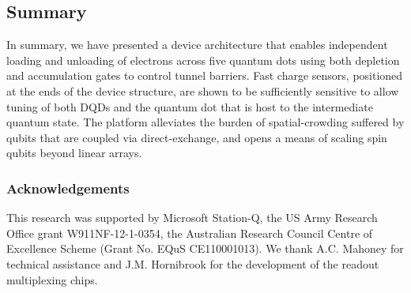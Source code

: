 \subsection{Summary}
In summary, we have presented a device architecture that enables independent loading and unloading of electrons across five quantum dots using both depletion and accumulation gates to control tunnel barriers. Fast charge sensors, positioned at the ends of the device structure, are shown to be sufficiently sensitive to allow tuning of both DQDs and the quantum dot that is host to the intermediate quantum state. The platform alleviates the burden of spatial-crowding suffered by qubits that are coupled via direct-exchange, and opens a means of scaling spin qubits beyond linear arrays. 

\subsubsection{Acknowledgements}
This research was supported by Microsoft Station-Q, the US Army Research Office grant W911NF-12-1-0354, the Australian Research Council Centre of Excellence Scheme (Grant No. EQuS CE110001013). We thank A.C. Mahoney for technical assistance and J.M. Hornibrook for the development of the readout multiplexing chips.

